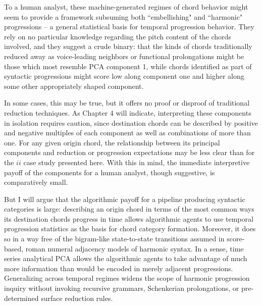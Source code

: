 To a human analyst, these machine-generated regimes of chord behavior might seem to provide a framework subsuming both ``embellishing" and ``harmonic" progressions -- a general statistical basis for temporal progression behavior.  They rely on no particular knowledge regarding the pitch content of the chords involved, and they suggest a crude binary: that the kinds of chords traditionally reduced away as voice-leading neighbors or functional prolongations might be those which most resemble PCA component 1, while chords identified as part of syntactic progressions might score low along component one and higher along some other appropriately shaped component.

In some cases, this may be true, but it offers no proof or disproof of traditional reduction techniques.  As Chapter 4 will indicate, interpreting these components in isolation requires caution, since destination chords can be described by positive and negative multiples of each component as well as combinations of more than one.  For any given origin chord, the relationship between its principal components and reduction or progression expectations may be less clear than for the $ii$ case study presented here.  With this in mind, the immediate interpretive payoff of the components for a human analyst, though suggestive, is comparatively small.

But I will argue that the algorithmic payoff for a pipeline producing syntactic categories is large: describing an origin chord in terms of the most common ways its destination chords progress in time allows algorithmic agents to use temporal progression statistics as the basis for chord category formation.  Moreover, it does so in a way free of the bigram-like state-to-state transitions assumed in score-based, roman numeral adjacency models of harmonic syntax.  In a sense, time series analytical PCA allows the algorithmic agents to take advantage of much more information than would be encoded in merely adjacent progressions.  Generalizing across temporal regimes widens the scope of harmonic progression inquiry without invoking recursive grammars, Schenkerian prolongations, or pre-determined surface reduction rules.
